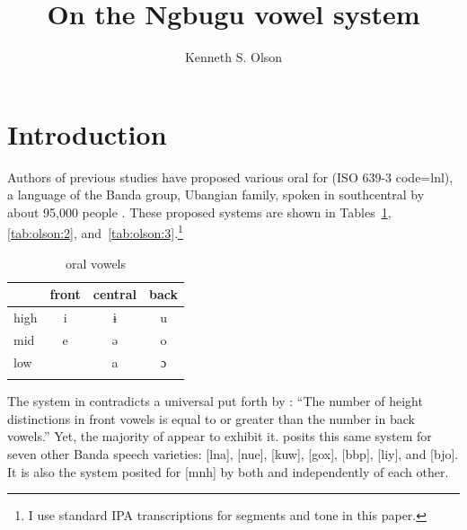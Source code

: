 \documentclass[output=paper,colorlinks,citecolor=brown]{langscibook}
\title{On the Ngbugu vowel system}
\author{Kenneth S. Olson\affiliation{SIL International}}
\begin{document}
\maketitle

\section{Introduction}\label{sec:olson:1}
\begin{sloppypar}
Authors of previous studies have proposed various oral  for  (ISO 639-3 code=lnl), a language of the Banda group, Ubangian  family, spoken in southcentral  by about 95,000 people \citep{SimonsFennig2018}. These proposed systems are shown in Tables~\ref{tab:olson:1}, \ref{tab:olson:2}, and~\ref{tab:olson:3}.\footnote{I use standard IPA transcriptions for segments and tone in this paper.}
\end{sloppypar}

\begin{table}
\caption{ oral vowels \citep[13--14]{Cloarec-Heiss1978}}
\label{tab:olson:1}
    \begin{tabular}{lccc}
    \lsptoprule
                & front & central & back\\
    \midrule
        high    & i     & ɨ       & u\\
        mid     & e     & ə       & o\\
        low     &       & a       & ɔ\\
    \lspbottomrule
    \end{tabular}
\end{table}

The system in  contradicts a universal  put forth by \citet[122]{Crothers1978}: “The number of height  distinctions in front vowels is equal to or greater than the number in back vowels.” Yet, the majority of  appear to exhibit it. \citet[13--16]{Cloarec-Heiss1978} posits this same system for seven other Banda speech varieties:  [lna],  [nue],  [kuw],  [gox],  [bbp],  [liy], and  [bjo]. It is also the system posited for  [mnh] by both \citet{Kamanda-Kola2003} and \citet{Olson2005} independently of each other.
\end{document}
